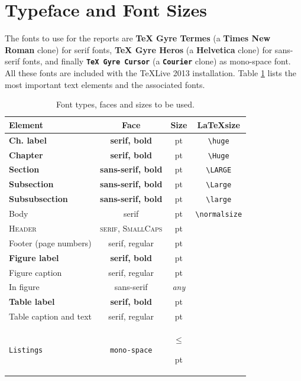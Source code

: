 \documentclass{cslthse-msc}
\makeatletter
\newcommand\thefontsize[1]{{#1 \f@size pt\par}}
\makeatother
\begin{document}
\section{Typeface and Font Sizes}
The fonts to use for the reports are \textbf{TeX Gyre Termes} (a \textbf{Times New Roman} clone) for serif fonts, \textsf{\textbf{TeX Gyre Heros}} (a \textsf{\textbf{Helvetica}} clone) for sans-serif fonts, and finally \texttt{\textbf{TeX Gyre Cursor}} (a \texttt{\textbf{Courier}} clone) as mono-space font. All these fonts are included with the TeXLive 2013 installation. Table \ref{tab:fonts} lists the most important text elements and the associated fonts.
\begin{table}[!hbt]
\caption{Font types, faces and sizes to be used.}\label{tab:fonts}

 \begin{tabular}{ l c c c}
\hline 
\textbf{Element} & \textbf{Face} & \textbf{Size} & \textbf{\LaTeX size} \\ 
\hline 
{\huge \textbf{Ch. label}} & {\huge \textbf{serif, bold}} & \thefontsize\huge & \verb+\huge+ \\ 
{\Huge \textbf{Chapter}} & {\Huge \textbf{serif, bold}} & \thefontsize\Huge & \verb+\Huge+ \\ 
{\LARGE \textsf{\textbf{Section}}} & {\Large \textsf{\textbf{sans-serif, bold}}} & \thefontsize\LARGE & \verb+\LARGE+ \\ 
{\Large \textsf{\textbf{Subsection}}} & {\Large \textsf{\textbf{sans-serif, bold}}} & \thefontsize\Large & \verb+\Large+ \\ 
{\large \textsf{\textbf{Subsubsection}}} & {\Large \textsf{\textbf{sans-serif, bold}}} & \thefontsize\large & \verb+\large+ \\ 
Body & serif & \thefontsize\normalsize & {\footnotesize \verb+\normalsize+} \\
{\footnotesize \textsc{Header}} & {\footnotesize \textsc{serif, SmallCaps}} & \thefontsize\footnotesize & \\
Footer (page numbers) & serif, regular & \thefontsize\normalsize & \\
\hline
\textbf{Figure label} & \textbf{serif, bold} & \thefontsize\normalsize & \\
Figure caption & serif, regular & \thefontsize\normalsize & \\
\textsf{In figure} & \textsf{sans-serif} & \textit{any} & \\
\textbf{Table label} & \textbf{serif, bold} & \thefontsize\normalsize & \\
Table caption and text & serif, regular & \thefontsize\normalsize & \\
\texttt{Listings} & \texttt{mono-space} & $\le$ \thefontsize\normalsize & \\
\hline 
\end{tabular} 
\end{table}
\end{document}
